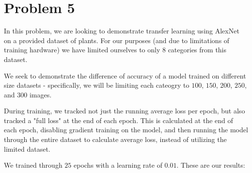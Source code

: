 \documentclass{article}
\begin{document}
\section*{Problem 5}

In this problem, we are looking to demonstrate transfer learning using AlexNet on a provided dataset of plants. For our purposes (and due to limitations of training hardware) we have limited ourselves to only 8 categories from this dataset.

We seek to demonstrate the difference of accuracy of a model trained on different size datasets - specifically, we will be limiting each cateogry to $100$, $150$, $200$, $250$, and $300$ images.

During training, we tracked not just the running average loss per epoch, but also tracked a "full loss" at the end of each epoch. This is calculated at the end of each epoch, disabling gradient training on the model, and then running the model through the entire dataset to calculate average loss, instead of utilizing the limited dataset.

We trained through $25$ epochs with a learning rate of $0.01$. These are our results:
\end{document}
